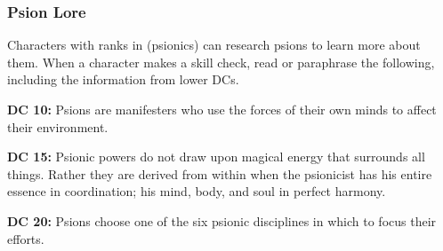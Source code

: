 \subsubsection{Psion Lore}

Characters with ranks in  (psionics) can research psions to learn more about them. When a character makes a skill check, read or paraphrase the following, including the information from lower DCs.

\textbf{DC 10:} Psions are manifesters who use the forces of their own minds to affect their environment.

\textbf{DC 15:} Psionic powers do not draw upon magical energy that surrounds all things. Rather they are derived from within when the psionicist has his entire essence in coordination; his mind, body, and soul in perfect harmony.

\textbf{DC 20:} Psions choose one of the six psionic disciplines in which to focus their efforts.
